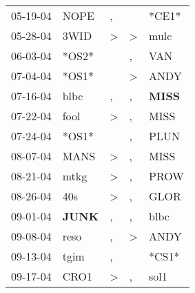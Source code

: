 \begin{supertabular}{p{0.07\textwidth}p{0.06\textwidth}p{0.02\textwidth}p{0.02\textwidth}p{0.06\textwidth}}
          05-19-04\textsuperscript{} &           NOPE\textsuperscript{} &                , &                  &                            *CE1* \\
          05-28-04\textsuperscript{} &           3WID\textsuperscript{} &     \textgreater &     \textgreater &           mulc\textsuperscript{} \\
          06-03-04\textsuperscript{} &                            *OS2* &                  &                , &            VAN\textsuperscript{} \\
          07-04-04\textsuperscript{} &                            *OS1* &                  &     \textgreater &           ANDY\textsuperscript{} \\
          07-16-04\textsuperscript{} &           blbc\textsuperscript{} &                , &                , &  \textbf{MISS\textsuperscript{}} \\
          07-22-04\textsuperscript{} &           fool\textsuperscript{} &     \textgreater &                , &           MISS\textsuperscript{} \\
          07-24-04\textsuperscript{} &                            *OS1* &                  &                , &           PLUN\textsuperscript{} \\
          08-07-04\textsuperscript{} &           MANS\textsuperscript{} &     \textgreater &                , &           MISS\textsuperscript{} \\
          08-21-04\textsuperscript{} &           mtkg\textsuperscript{} &     \textgreater &                , &           PROW\textsuperscript{} \\
          08-26-04\textsuperscript{} &            40s\textsuperscript{} &     \textgreater &                , &           GLOR\textsuperscript{} \\
          09-01-04\textsuperscript{} &  \textbf{JUNK\textsuperscript{}} &                , &                , &           blbc\textsuperscript{} \\
          09-08-04\textsuperscript{} &           reso\textsuperscript{} &                , &     \textgreater &           ANDY\textsuperscript{} \\
          09-13-04\textsuperscript{} &           tgim\textsuperscript{} &                , &                  &                            *CS1* \\
          09-17-04\textsuperscript{} &           CRO1\textsuperscript{} &     \textgreater &                , &           sol1\textsuperscript{} \\

\end{supertabular}
